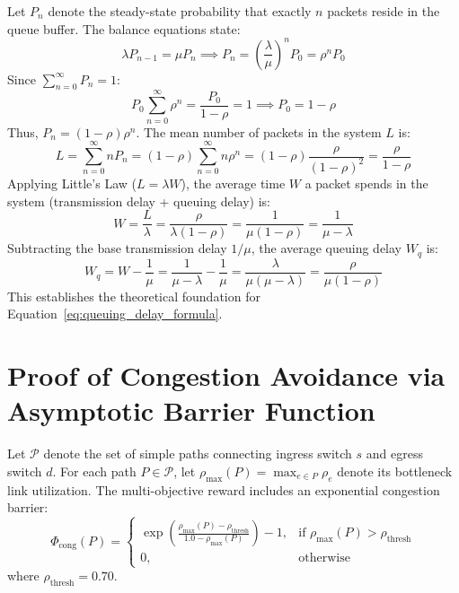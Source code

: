 \documentclass[12pt,a4paper,oneside]{report}
\begin{document}
Let $P_n$ denote the steady-state probability that exactly $n$ packets reside in the queue buffer. The balance equations state:
\begin{equation}
    \lambda P_{n-1} = \mu P_n \implies P_n = \left(\frac{\lambda}{\mu}\right)^n P_0 = \rho^n P_0
\end{equation}
Since $\sum_{n=0}^\infty P_n = 1$:
\begin{equation}
    P_0 \sum_{n=0}^\infty \rho^n = \frac{P_0}{1 - \rho} = 1 \implies P_0 = 1 - \rho
\end{equation}
Thus, $P_n = (1 - \rho)\rho^n$. The mean number of packets in the system $L$ is:
\begin{equation}
    L = \sum_{n=0}^\infty n P_n = (1 - \rho) \sum_{n=0}^\infty n \rho^n = (1 - \rho) \frac{\rho}{(1 - \rho)^2} = \frac{\rho}{1 - \rho}
\end{equation}
Applying Little's Law ($L = \lambda W$), the average time $W$ a packet spends in the system (transmission delay + queuing delay) is:
\begin{equation}
    W = \frac{L}{\lambda} = \frac{\rho}{\lambda(1 - \rho)} = \frac{1}{\mu(1 - \rho)} = \frac{1}{\mu - \lambda}
\end{equation}
Subtracting the base transmission delay $1/\mu$, the average queuing delay $W_q$ is:
\begin{equation}
    W_q = W - \frac{1}{\mu} = \frac{1}{\mu - \lambda} - \frac{1}{\mu} = \frac{\lambda}{\mu(\mu - \lambda)} = \frac{\rho}{\mu(1 - \rho)}
\end{equation}
This establishes the theoretical foundation for Equation~\ref{eq:queuing_delay_formula}.

\section{Proof of Congestion Avoidance via Asymptotic Barrier Function}
\label{sec:proof_barrier}
Let $\mathcal{P}$ denote the set of simple paths connecting ingress switch $s$ and egress switch $d$. For each path $P \in \mathcal{P}$, let $\rho_{\max}(P) = \max_{e \in P} \rho_e$ denote its bottleneck link utilization. The multi-objective reward includes an exponential congestion barrier:
\begin{equation}
    \Phi_{\text{cong}}(P) = \begin{cases}
        \exp\left(\frac{\rho_{\max}(P) - \rho_{\text{thresh}}}{1.0 - \rho_{\max}(P)}\right) - 1, & \text{if } \rho_{\max}(P) > \rho_{\text{thresh}} \\
        0, & \text{otherwise}
    \end{cases}
\end{equation}
where $\rho_{\text{thresh}} = 0.70$.
\end{document}
